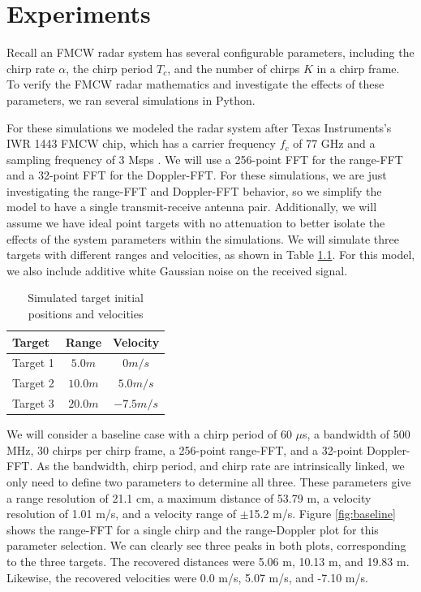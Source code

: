 \chapter{Experiments}
Recall an FMCW radar system has several configurable parameters, including the
chirp rate $\alpha$, the chirp period $T_c$, and the number of chirps $K$ in a chirp
frame. To verify the FMCW radar mathematics and investigate
the effects of these parameters, we ran several simulations in Python.

For these simulations we modeled the radar system after Texas Instruments's
IWR 1443 FMCW chip, which has a carrier frequency $f_c$ of 77 GHz and a sampling
frequency of 3 Msps \cite{iwr1443datasheet}. We will use a 256-point FFT for the
range-FFT and a 32-point FFT for the Doppler-FFT. For these simulations, we are just investigating the
range-FFT and Doppler-FFT behavior, so we simplify the model to have a single
transmit-receive antenna pair. Additionally, we will assume we have ideal point
targets with no attenuation to better isolate the effects of the system
parameters within the simulations. We will simulate three targets with different
ranges and velocities, as shown in Table \ref{tab:targets}. For this
model, we also include additive white Gaussian noise on the received signal.

\begin{table}[h]
	\centering
	\begin{tabular}{l|c|c}
		Target & Range & Velocity \\
		\hline
		Target 1 & $5.0 m$ & $0 m/s$ \\
		Target 2 & $10.0 m$ & $5.0 m/s$ \\
		Target 3 & $20.0 m$ & $-7.5 m/s$ 
	\end{tabular}
	\caption{Simulated target initial positions and velocities}
	\label{tab:targets}
\end{table}

We will consider a baseline case with a chirp period of 60 $\mu$s, a
bandwidth of 500 MHz, 30 chirps per chirp frame, a 256-point range-FFT,  and a
32-point Doppler-FFT. As the bandwidth, chirp period, and chirp rate are
intrinsically linked, we only need to define two parameters to determine all
three. These parameters give a range resolution of 21.1 cm, a maximum distance
of 53.79 m, a velocity resolution of 1.01 m/s, and a velocity range of $\pm$15.2
m/s. Figure \ref{fig:baseline} shows the range-FFT for a single chirp and the
range-Doppler plot for this parameter selection. We can clearly see three peaks
in both plots, corresponding to the three targets. The recovered distances were
5.06 m, 10.13 m, and 19.83 m. Likewise, the recovered velocities were 0.0 m/s,
5.07 m/s, and -7.10 m/s.

